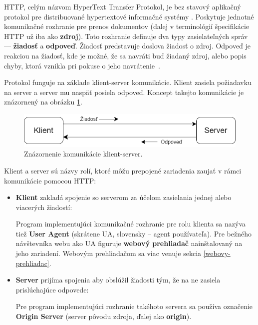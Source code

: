 HTTP, celým názvom HyperText Transfer Protokol, je bez stavový aplikačný protokol pre distribuované hypertextové informačné systémy \cite{rfc9110}. 
Poskytuje jednotné komunikačné rozhranie pre prenos dokumentov (ďalej v terminológií špecifikácie HTTP už iba ako \textbf{zdroj}).
Toto rozhranie definuje dva typy zasielateľných správ --- \textbf{žiadosť} a \textbf{odpoveď}. 
Žiadosť predstavuje doslova žiadosť o zdroj. 
Odpoveď je reakciou na žiadosť, kde je možné, že sa navráti buď žiadaný zdroj, alebo popis chyby, ktorá vznikla pri pokuse o jeho \mbox{navrátenie \cite{rfc7230}}. 

Protokol funguje na základe klient-server komunikácie. Klient zasiela požiadavku na server a server mu naspäť posiela odpoveď.
Koncept takejto komunikácie je znázornený na obrázku \ref{fig:http-client-server}.

\begin{figure}[htb]
\begin{center}
    \includegraphics[scale=0.6]{obrazky-figures/http-client-server.png}
    \caption{Znázornenie komunikácie klient-server.}
    \label{fig:http-client-server}
\end{center}
\end{figure}

Klient a server sú názvy rolí, ktoré môžu prepojené zariadenia zaujať v rámci komunikácie pomocou HTTP:
\begin{itemize}
    \item \textbf{Klient} zakladá spojenie so serverom za účelom zasielania jednej alebo viacerých \mbox{žiadostí}: 
    
    Program implementujúci komunikačné rozhranie pre rolu klienta sa nazýva tiež \textbf{User Agent} \cite{rfc9110} (skrátene UA, slovensky -- agent používateľa). 
    Pre bežného návštevníka webu ako UA \mbox{figuruje} \textbf{webový prehliadač} nainštalovaný na jeho zariadení. 
    Webovým prehliadačom sa viac venuje sekcia \ref{webovy-prehliadac}.
    
    \item \textbf{Server} prijíma spojenia aby obslúžil žiadosti tým, že na ne zasiela prislúchajúce odpovede:

    Pre program implementujúci rozhranie takéhoto servera sa používa označenie \textbf{Origin Server} (server pôvodu zdroja, ďalej ako \textbf{origin}).
\end{itemize}


